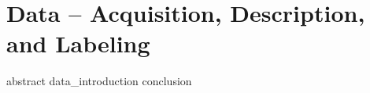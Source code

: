 \chapter{Data -- Acquisition, Description, and Labeling}
\label{chapter:data_aquisition_and_labeling}
\glsresetall
{abstract}
\clearpage
{data_introduction}
{conclusion}